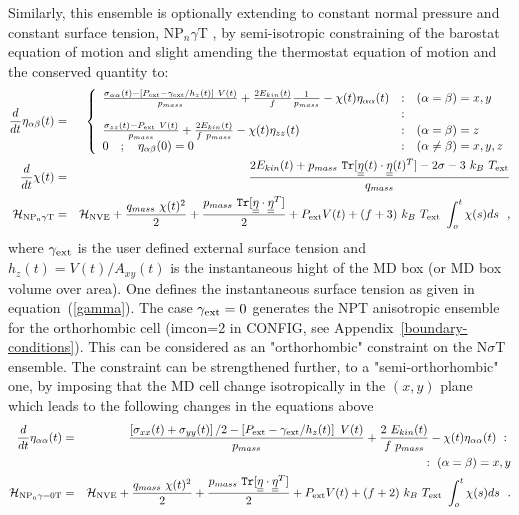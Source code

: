 Similarly, this ensemble is optionally extending to constant
normal pressure and constant surface tension, NP$_{n}\gamma$T
\cite{ikeguchi-04a}, by semi-isotropic constraining of the
barostat equation of motion and slight amending the thermostat
equation of motion and the conserved quantity to:
\begin{eqnarray}
\frac{d}{dt} \eta_{\alpha\beta}(t) &=& \left\{ \begin{array} {l@{\quad:\quad}l}
\frac{\sigma_{\alpha\alpha}(t) - \left[ P_{\rm ext} - \gamma_{\rm ext} / h_{z}(t) \right]~V(t)}{p_{mass}} +
\frac{2 E_{kin}(t)}{f} \frac{1}{p_{mass}} - \chi(t) \eta_{\alpha\alpha}(t) & (\alpha = \beta) = x,y \\
& \\
\frac{\sigma_{zz}(t) - P_{\rm ext}~V(t)}{p_{mass}} +
\frac{2 E_{kin}(t)}{f~p_{mass}} - \chi(t) \eta_{zz}(t) & (\alpha = \beta) = z \\
0~~~;~~~\eta_{\alpha\beta}(0) = 0 & (\alpha \ne \beta) = x,y,z
\end{array} \right. \nonumber \\
\frac{d}{dt} \chi(t) &=& \frac{2 E_{kin}(t) + p_{mass}~{\tt Tr}[\mat{\eta}(t) \cdot
\mat{\eta}(t)^{T}] - 2 \sigma - 3~k_{B}~T_{\rm ext}}{q_{mass}} \\
{\cal H}_{\rm NP_{n}\gamma T} &=& {\cal H}_{\rm NVE} + {q_{mass}~\chi (t)^{2} \over 2} +
{p_{mass}~{\tt Tr}[\mat{\eta} \cdot \mat{\eta}^{T}] \over 2} + P_{\rm ext} V(t) +
(f+3)~k_{B}~T_{\rm ext}~\int_o^t \chi (s) ds~~, \nonumber
\end{eqnarray}
where $\gamma_{\rm ext}$ is the user defined external surface tension
and $h_{z}(t) = V(t) / A_{xy}(t)$ is the instantaneous hight of the
MD box (or MD box volume over area).  One defines the instantaneous surface
tension as given in equation~(\ref{gamma}).  The case $\gamma_{\rm ext}=0$
generates the NPT anisotropic ensemble for the orthorhombic cell
(imcon=2 in CONFIG, see Appendix~\ref{boundary-conditions}).  This
can be considered as an "orthorhombic" constraint on the N$\sigma$T ensemble.
The constraint can be strengthened further, to a "semi-orthorhombic" one, by
imposing that the MD cell change isotropically in the $(x,y)$ plane which
leads to the following changes in the equations above
\begin{eqnarray}
\frac{d}{dt} \eta_{\alpha\alpha}(t) &=& \frac{\left[\sigma_{xx}(t)+\sigma_{yy}(t)\right]/2 -
\left[ P_{\rm ext} - \gamma_{\rm ext} / h_{z}(t) \right]~V(t)}{p_{mass}} + \frac{2~E_{kin}(t)}{f~p_{mass}} -
\chi (t) \eta_{\alpha\alpha}(t)~:~\nonumber \\
 & & \phantom{xxxxxxxxxxxxxxxxxxxxxxxxxxxxxxxxxxxxxxxxx}~:~(\alpha = \beta) = x,y\\
{\cal H}_{\rm NP_{n}{\gamma}{=0}T} &=& {\cal H}_{\rm NVE} + {q_{mass}~\chi (t)^{2} \over 2} +
{p_{mass}~{\tt Tr}[\mbox{$\underline{\underline{\bf \eta}}$} \cdot \mbox{$\underline{\underline{\bf \eta}}$}^{T}] \over 2} + P_{\rm ext} V(t) +
(f+2)~k_{B}~T_{\rm ext}~\int_o^t \chi (s) ds~~.\nonumber
\end{eqnarray}

